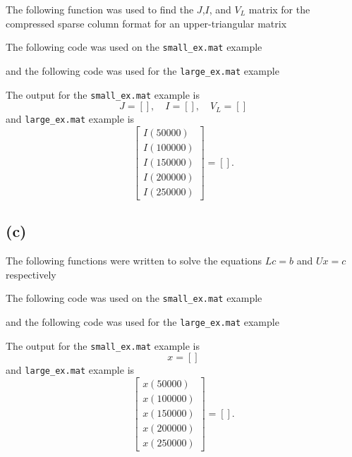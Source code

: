 \documentclass[11pt]{article}
\theoremstyle{definition}
\theoremstyle{remark}
\newcommand{\newpart}{\vspace{-0.5\baselineskip}\hrulefill\vspace{-1.3\baselineskip}}
\theoremstyle{plain}
\begin{document}
The following function was used to find the $J$,$I$, and $V_L$ matrix for the compressed sparse column format for an upper-triangular matrix

The following code was used on the \texttt{small\_ex.mat} example

and the following code was used for the \texttt{large\_ex.mat} example

The output for the \texttt{small\_ex.mat} example is
\begin{equation*}
  J=\left[\right],\quad I=\left[\right],\quad V_L=\left[\right]
\end{equation*}
and \texttt{large\_ex.mat} example is
\begin{equation*}
  \left[
    \begin{array}{r}
      I(50000)\\
      I(100000)\\
      I(150000)\\
      I(200000)\\
      I(250000)
    \end{array}
  \right]=\left[\right].
\end{equation*}

\newpage
\newpart
\subsection*{(c)}
The following functions were written to solve the equations $Lc=b$ and $Ux=c$ respectively


The following code was used on the \texttt{small\_ex.mat} example

and the following code was used for the \texttt{large\_ex.mat} example

The output for the \texttt{small\_ex.mat} example is
\begin{equation*}
  x=\left[\right]
\end{equation*}
and \texttt{large\_ex.mat} example is
\begin{equation*}
  \left[
    \begin{array}{r}
      x(50000)\\
      x(100000)\\
      x(150000)\\
      x(200000)\\
      x(250000)
    \end{array}
  \right]=\left[\right].
\end{equation*}
\end{document}
